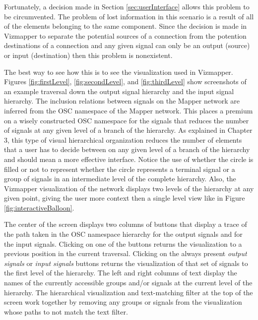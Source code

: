 Fortunately, a decision made in Section \ref{sec:userInterface} allows this problem to be circumvented. The problem of lost information in this scenario is a result of all of the elements belonging to the same component. Since the decision is made in Vizmapper to separate the potential sources of a connection from the potention destinations of a connection and any given signal can only be an output (source) or input (destination) then this problem is nonexistent.

The best way to see how this is to see the visualization used in Vizmapper. Figures \ref{fig:firstLevel}, \ref{fig:secondLevel}, and \ref{fig:thirdLevel} show screenshots of an example traversal down the output signal hierarchy and the input signal hierarchy. The inclusion relations between signals on the Mapper network are inferred from the OSC namespace of the Mapper network. This places a premium on a wisely constructed OSC namespace for the signals that reduces the number of signals at any given level of a branch of the hierarchy. As explained in Chapter 3, this type of visual hierarchical organization reduces the number of elements that a user has to decide between on any given level of a branch of the hierarchy and should mean a more effective interface. Notice the use of whether the circle is filled or not to represent whether the circle represents a terminal signal or a group of signals in an intermediate level of the complete hierarchy. Also, the Vizmapper visualization of the network displays two levels of the hierarchy at any given point, giving the user more context then a single level view like in Figure \ref{fig:interactiveBalloon}.

The center of the screen displays two columns of buttons that display a trace of the path taken in the OSC namespace hierarchy for the output signals and for the input signals. Clicking on one of the buttons returns the visualization to a previous position in the current traversal. Clicking on the always present \emph{output signals} or \emph{input signals} buttons returns the visualization of that set of signals to the first level of the hierarchy. The left and right columns of text display the names of the currently accessible groups and/or signals at the current level of the hierarchy. The hierarchical visualization and text-matching filter at the top of the screen work together by removing any groups or signals from the visualization whose paths to not match the text filter.

